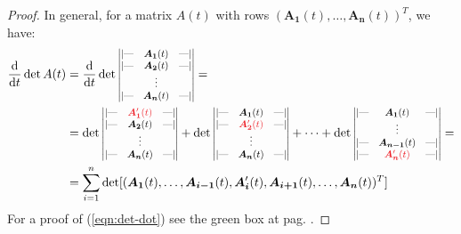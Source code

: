 \documentclass[../../main.tex]{subfiles}
\begin{document}
\begin{proof}
    In general, for a matrix $A(t)$ with rows $(\bm{A_{1}}(t), \dots, \bm{A_{n}}(t))^T$, we have:    
    \begin{align} \nonumber
        \dv{t}\operatorname{det} A(t) &= \dv{t} \operatorname{det} \scalebox{0.8}{$\begin{vmatrix}
            \text{|---} & \bm{A_1}(t) & \text{---|} \\
            \text{|---} & \bm{A_2}(t) & \text{---|} \\
            & \vdots & \\
            \text{|---} & \bm{A_n}(t) & \text{---|} 
        \end{vmatrix}$} = \\ \nonumber
        &= \operatorname{det} \scalebox{0.8}{$\begin{vmatrix}
            \text{|---} & \textcolor{Red}{\bm{A_1}'(t)} & \text{---|} \\
            \text{|---} & \bm{A_2}(t) & \text{---|} \\
            & \vdots & \\
            \text{|---} & \bm{A_n}(t) & \text{---|} 
        \end{vmatrix}$} + \operatorname{det} \scalebox{0.8}{$\begin{vmatrix}
            \text{|---} & \bm{A_1}(t) & \text{---|} \\
            \text{|---} & \textcolor{Red}{\bm{A_2}'(t)} & \text{---|} \\
            & \vdots & \\
            \text{|---} & \bm{A_n}(t) & \text{---|} 
        \end{vmatrix}$} + \dots + \operatorname{det} \scalebox{0.8}{$\begin{vmatrix}
            \text{|---} & \bm{A_1}(t) & \text{---|} \\
            & \vdots & \\
            \text{|---} & \bm{A_{n-1}}(t) & \text{---|} \\
            \text{|---} & \textcolor{Red}{\bm{A_n}'(t)} & \text{---|} 
        \end{vmatrix}$} = \\
        &= \sum_{i=1}^n \operatorname{det}[(\bm{A_1}(t), \dots, \bm{A_{i-1}}(t), \bm{A_i}'(t), \bm{A_{i+1}}(t), \dots, \bm{A_n}(t) )^T] \label{eqn:det-dot}
    \end{align}
    For a proof of (\ref{eqn:det-dot}) see the green box at pag. \pageref{proof:det-dot}.
    

\end{proof}
\end{document}
